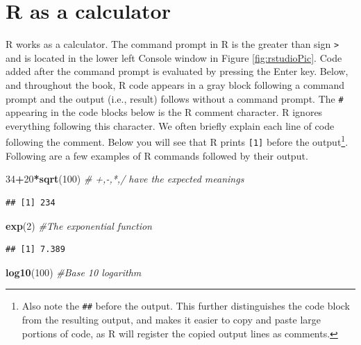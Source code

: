 \documentclass[
]{krantz}
\newenvironment{Shaded}{\begin{snugshade}}{\end{snugshade}}
\newcommand{\CommentTok}[1]{\textcolor[rgb]{0.56,0.35,0.01}{\textit{#1}}}
\newcommand{\DecValTok}[1]{\textcolor[rgb]{0.00,0.00,0.81}{#1}}
\newcommand{\KeywordTok}[1]{\textcolor[rgb]{0.13,0.29,0.53}{\textbf{#1}}}
\newcommand{\NormalTok}[1]{#1}
\newcommand{\OperatorTok}[1]{\textcolor[rgb]{0.81,0.36,0.00}{\textbf{#1}}}
\begin{document}
\hypertarget{RCalculator}{%
\section{R as a calculator}\label{RCalculator}}

R works as a calculator. The command prompt in R is the greater than sign \texttt{\textgreater{}} and is located in the lower left Console window in Figure \ref{fig:rstudioPic}. Code added after the command prompt is evaluated by pressing the Enter key. Below, and throughout the book, R code appears in a gray block following a command prompt and the output (i.e., result) follows without a command prompt. The \texttt{\#} appearing in the code blocks below is the R comment character. R ignores everything following this character. We often briefly explain each line of code following the comment. Below you will see that R prints \texttt{{[}1{]}} before the output\footnote{Also note the \texttt{\#\#} before the output. This further distinguishes the code block from the resulting output, and makes it easier to copy and paste large portions of code, as R will register the copied output lines as comments.}. Following are a few examples of R commands followed by their output.

\begin{Shaded}
\begin{Highlighting}[]
\DecValTok{34}\OperatorTok{+}\DecValTok{20}\OperatorTok{*}\KeywordTok{sqrt}\NormalTok{(}\DecValTok{100}\NormalTok{)  }\CommentTok{\# +,{-},*,/ have the expected meanings}
\end{Highlighting}
\end{Shaded}

\begin{verbatim}
## [1] 234
\end{verbatim}

\begin{Shaded}
\begin{Highlighting}[]
\KeywordTok{exp}\NormalTok{(}\DecValTok{2}\NormalTok{)  }\CommentTok{\#The exponential function}
\end{Highlighting}
\end{Shaded}

\begin{verbatim}
## [1] 7.389
\end{verbatim}

\begin{Shaded}
\begin{Highlighting}[]
\KeywordTok{log10}\NormalTok{(}\DecValTok{100}\NormalTok{)  }\CommentTok{\#Base 10 logarithm}
\end{Highlighting}
\end{Shaded}
\end{document}
